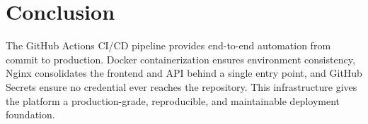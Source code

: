 \section*{Conclusion}
The GitHub Actions CI/CD pipeline provides end-to-end automation from commit to production. Docker containerization ensures environment consistency, Nginx consolidates the frontend and API behind a single entry point, and GitHub Secrets ensure no credential ever reaches the repository. This infrastructure gives the platform a production-grade, reproducible, and maintainable deployment foundation.
